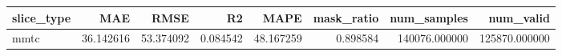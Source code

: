 \begin{tabular}{lrrrrrrr}
\toprule
slice_type & MAE & RMSE & R2 & MAPE & mask_ratio & num_samples & num_valid \\
\midrule
mmtc & 36.142616 & 53.374092 & 0.084542 & 48.167259 & 0.898584 & 140076.000000 & 125870.000000 \\
\bottomrule
\end{tabular}
